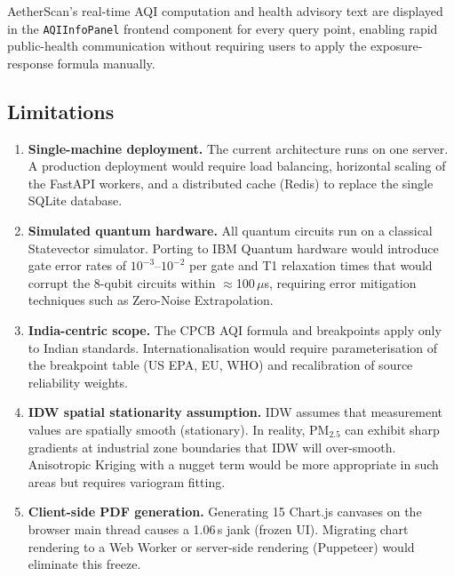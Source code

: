 \documentclass[12pt,a4paper]{article}
\begin{document}
AetherScan's real-time AQI computation and health advisory text are
displayed in the \texttt{AQIInfoPanel} frontend component for every
query point, enabling rapid public-health communication without requiring
users to apply the exposure-response formula manually.

\subsection{Limitations}
\label{sec:discussion:limits}

\begin{enumerate}[leftmargin=*]
\item \textbf{Single-machine deployment.} The current architecture runs
      on one server. A production deployment would require load balancing,
      horizontal scaling of the FastAPI workers, and a distributed cache
      (Redis) to replace the single SQLite database.

\item \textbf{Simulated quantum hardware.} All quantum circuits run on
      a classical Statevector simulator. Porting to IBM Quantum hardware
      would introduce gate error rates of $10^{-3}$--$10^{-2}$ per gate
      and T1 relaxation times that would corrupt the 8-qubit circuits within
      $\approx$100\,$\mu$s, requiring error mitigation techniques such as
      Zero-Noise Extrapolation.

\item \textbf{India-centric scope.} The CPCB AQI formula and breakpoints
      apply only to Indian standards. Internationalisation would require
      parameterisation of the breakpoint table (US EPA, EU, WHO) and
      recalibration of source reliability weights.

\item \textbf{IDW spatial stationarity assumption.} IDW assumes that
      measurement values are spatially smooth (stationary). In reality,
      PM$_{2.5}$ can exhibit sharp gradients at industrial zone boundaries
      that IDW will over-smooth. Anisotropic Kriging with a nugget term
      would be more appropriate in such areas but requires variogram fitting.

\item \textbf{Client-side PDF generation.} Generating 15 Chart.js canvases
      on the browser main thread causes a 1.06\,s jank (frozen UI). Migrating
      chart rendering to a Web Worker or server-side rendering (Puppeteer)
      would eliminate this freeze.
\end{enumerate}
\end{document}
